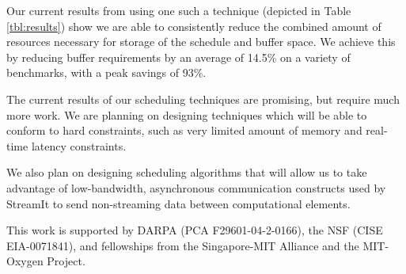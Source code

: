 Our current results from using one such a technique (depicted in 
Table \ref{tbl:results}) show we are able to consistently reduce the 
combined amount of resources necessary for storage of the schedule 
and buffer space.  We achieve this by reducing buffer requirements 
by an average of 14.5\% on a variety of benchmarks, with a peak
savings of 93\%.


The current results of our scheduling techniques are promising, but
require much more work. We are planning on designing techniques which
will be able to conform to hard constraints, such as very limited amount
of memory and real-time latency constraints.

We also plan on designing scheduling algorithms that will allow us to
take advantage of low-bandwidth, asynchronous communication constructs
used by StreamIt to send non-streaming data between computational elements.

This work is supported by DARPA (PCA F29601-04-2-0166),
the NSF (CISE EIA-0071841), and fellowships from the
Singapore-MIT Alliance and the MIT-Oxygen Project.

